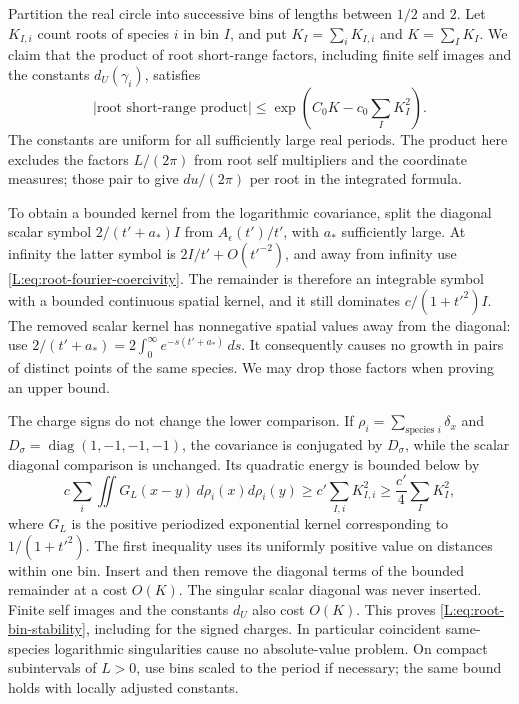 Partition the real circle into successive bins of lengths between
$1/2$ and $2$. Let $K_{I,i}$ count roots of species $i$ in bin $I$, and
put $K_I=\sum_iK_{I,i}$ and $K=\sum_IK_I$. We claim that the product of
root short-range factors, including finite self images and the constants $d_U(\gamma_i)$,
satisfies
\begin{equation}\label{L:eq:root-bin-stability}
 \left|\text{root short-range product}\right|
 \le \exp\left(C_0K-c_0\sum_IK_I^2\right).
\end{equation}
The constants are uniform for all sufficiently large real periods.
The product here excludes the factors $L/(2\pi)$ from root self
multipliers and the coordinate measures; those pair to give $du/(2\pi)$
per root in the integrated formula.

To obtain a bounded kernel from the logarithmic covariance, split the
diagonal scalar symbol $2/(t'+a_*)I$ from $A_\epsilon(t')/t'$, with
$a_*$ sufficiently large. At infinity the latter symbol is
$2I/t'+O(t'^{-2})$, and away from infinity use
\eqref{L:eq:root-fourier-coercivity}. The remainder is therefore an
integrable symbol with a bounded continuous spatial kernel, and it
still dominates $c/(1+t'^2)I$. The removed scalar kernel has nonnegative
spatial values away from the diagonal: use
$2/(t'+a_*)=2\int_0^\infty e^{-s(t'+a_*)}\,ds$. It consequently causes no growth in
pairs of distinct points of the same species. We may drop those factors
when proving an upper bound.

The charge signs do not change the lower comparison. If
$\rho_i=\sum_{\text{species }i}\delta_x$ and
$D_\sigma=\operatorname{diag}(1,-1,-1,-1)$, the covariance is conjugated by $D_\sigma$,
while the scalar diagonal comparison is unchanged. Its quadratic energy
is bounded below by
\[
 c\sum_i\iint G_L(x-y)\,d\rho_i(x)d\rho_i(y)
 \ge c'\sum_{I,i}K_{I,i}^2
 \ge\frac{c'}4\sum_IK_I^2,
\]
where $G_L$ is the positive periodized exponential kernel corresponding
to $1/(1+t'^2)$. The first inequality uses its uniformly positive value
on distances within one bin. Insert and then remove the diagonal terms
of the bounded remainder at a cost $O(K)$. The singular scalar diagonal
was never inserted. Finite self images and the constants $d_U$ also cost
$O(K)$. This proves \eqref{L:eq:root-bin-stability}, including for the
signed charges. In particular coincident same-species logarithmic
singularities cause no absolute-value problem. On compact subintervals
of $L>0$, use bins scaled to the period if necessary; the same bound
holds with locally adjusted constants.

